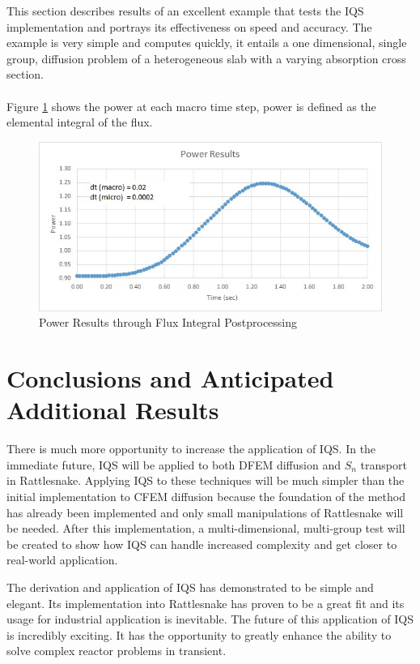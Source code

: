 \documentclass[12pt]{article}
\begin{document}
This section describes results of an excellent example that tests the IQS implementation and portrays its effectiveness on speed and accuracy.  The example is very simple and computes quickly, it entails a one dimensional, single group, diffusion problem of a heterogeneous slab with a varying absorption cross section.
\\ \\
Figure \ref{fig:power} shows the power at each macro time step, power is defined as the elemental integral of the flux.
\begin{figure}[h]
\includegraphics[width=\linewidth]{figures/power_results.jpg}
\caption{Power Results through Flux Integral Postprocessing}
\label{fig:power}
\end{figure}


%
\section{Conclusions and Anticipated Additional Results} 
\label{sect::ccl}

There is much more opportunity to increase the application of IQS.  In the immediate future, IQS will be applied to both DFEM diffusion and $S_n$ transport in Rattlesnake.  Applying IQS to these techniques will be much simpler than the initial implementation to CFEM diffusion because the foundation of the method has already been implemented and only small manipulations of Rattlesnake will be needed.  After this implementation, a multi-dimensional, multi-group test will be created to show how IQS can handle increased complexity and get closer to real-world application.

The derivation and application of IQS has demonstrated to be simple and elegant.  Its implementation into Rattlesnake has proven to be a great fit and its usage for industrial application is inevitable.  The future of this application of IQS is incredibly exciting.  It has the opportunity to greatly enhance the ability to solve complex reactor problems in transient.


%


\end{document}
